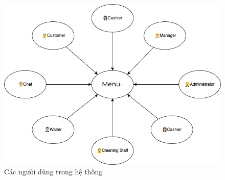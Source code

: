 \begin{figure}[H]
    \centering
    \includegraphics[width=15cm]{Images/OMS-Page-2.png}
    \vspace{0.5cm}
    \caption{Các người dùng trong hệ thống}
    \label{fig:my_label}
\end{figure}


